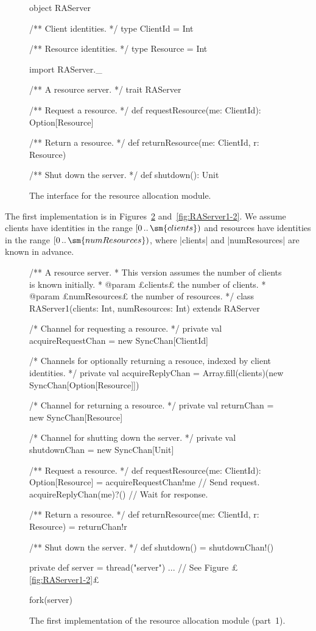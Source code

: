 \begin{figure}
\begin{scala}
object RAServer{
  /** Client identities. */
  type ClientId = Int

  /** Resource identities. */
  type Resource = Int
}

import RAServer._

/** A resource server. */
trait RAServer{
  /** Request a resource. */
  def requestResource(me: ClientId): Option[Resource]

  /** Return a resource. */
  def returnResource(me: ClientId, r: Resource) 

  /** Shut down the server. */
  def shutdown(): Unit
} 
\end{scala}
\caption{The interface for the resource allocation module.}
\label{fig:RAServer}
\end{figure}



The first implementation is in Figures~\ref{fig:RAServer1-1}
and~\ref{fig:RAServer1-2}.  We assume clients have identities in the range
$\interval0{\sm{clients}}$ and resources have identities in the range
$\interval0{\sm{numResources}}$, where |clients| and |numResources| are known
in advance.


\begin{figure}
\begin{scala}
/** A resource server. 
  * This version assumes the number of clients is known initially. 
  * @param £clients£ the number of clients.
  * @param £numResources£ the number of resources.  */
class RAServer1(clients: Int, numResources: Int) extends RAServer{

  /* Channel for requesting a resource. */
  private val acquireRequestChan = new SyncChan[ClientId]

  /* Channels for optionally returning a resouce, indexed by client identities. */
  private val acquireReplyChan = 
    Array.fill(clients)(new SyncChan[Option[Resource]])

  /* Channel for returning a resource. */
  private val returnChan = new SyncChan[Resource]

  /* Channel for shutting down the server. */
  private val shutdownChan = new SyncChan[Unit]

  /** Request a resource. */
  def requestResource(me: ClientId): Option[Resource] = {
    acquireRequestChan!me  // Send request.
    acquireReplyChan(me)?() // Wait for response.
  }

  /** Return a resource. */
  def returnResource(me: ClientId, r: Resource) = returnChan!r

  /** Shut down the server. */
  def shutdown() = shutdownChan!()

  private def server = thread("server"){ ...  } // See Figure £\ref{fig:RAServer1-2}£

  fork(server)
}
\end{scala}
\caption{The first implementation of the resource allocation module (part~1).}
\label{fig:RAServer1-1} 
\end{figure}

